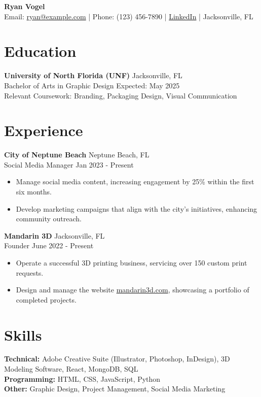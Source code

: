 \documentclass[10pt]{article}
\begin{document}
\begin{center}
    {\LARGE \textbf{Ryan Vogel}}\\
    \vspace{0.5em}
    Email: \href{mailto:ryan@example.com}{ryan@example.com} | Phone: (123) 456-7890 | \href{https://linkedin.com/in/ryanvogel}{LinkedIn} | Jacksonville, FL
\end{center}

\section*{Education}
\textbf{University of North Florida (UNF)} \hfill Jacksonville, FL\\
Bachelor of Arts in Graphic Design \hfill Expected: May 2025\\
Relevant Coursework: Branding, Packaging Design, Visual Communication

\section*{Experience}
\textbf{City of Neptune Beach} \hfill Neptune Beach, FL\\
Social Media Manager \hfill Jan 2023 - Present
\begin{itemize}[leftmargin=0.15in]
    \item Manage social media content, increasing engagement by 25\% within the first six months.
    \item Develop marketing campaigns that align with the city's initiatives, enhancing community outreach.
\end{itemize}

\textbf{Mandarin 3D} \hfill Jacksonville, FL\\
Founder \hfill June 2022 - Present
\begin{itemize}[leftmargin=0.15in]
    \item Operate a successful 3D printing business, servicing over 150 custom print requests.
    \item Design and manage the website \href{https://mandarin3d.com}{mandarin3d.com}, showcasing a portfolio of completed projects.
\end{itemize}

\section*{Skills}
\textbf{Technical:} Adobe Creative Suite (Illustrator, Photoshop, InDesign), 3D Modeling Software, React, MongoDB, SQL\\
\textbf{Programming:} HTML, CSS, JavaScript, Python\\
\textbf{Other:} Graphic Design, Project Management, Social Media Marketing
\end{document}

